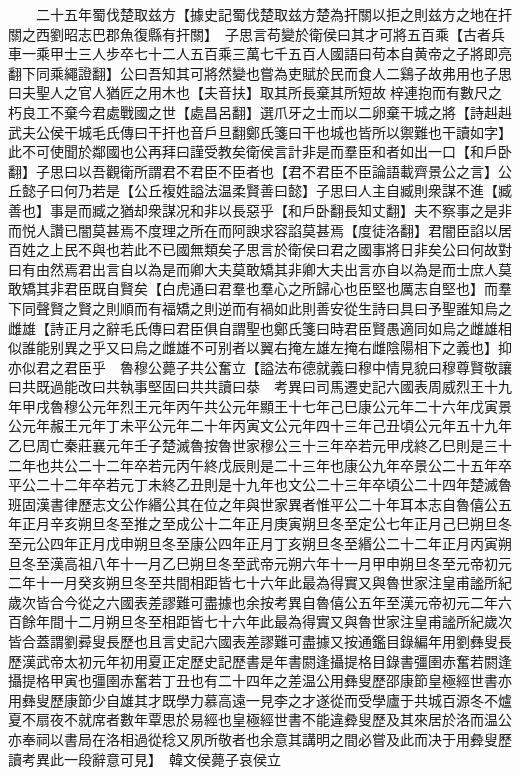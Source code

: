 　　二十五年蜀伐楚取兹方【據史記蜀伐楚取兹方楚為扞關以拒之則兹方之地在扞關之西劉昭志巴郡魚復縣有扞關】　子思言苟變於衛侯曰其才可將五百乘【古者兵車一乘甲士三人步卒七十二人五百乘三萬七千五百人國語曰苟本自黄帝之子將即亮翻下同乘繩證翻】公曰吾知其可將然變也嘗為吏賦於民而食人二鷄子故弗用也子思曰夫聖人之官人猶匠之用木也【夫音扶】取其所長棄其所短故梓連抱而有數尺之朽良工不棄今君處戰國之世【處昌呂翻】選爪牙之士而以二卵棄干城之將【詩赳赳武夫公侯干城毛氏傳曰干扞也音戶旦翻鄭氏箋曰干也城也皆所以禦難也干讀如字】此不可使聞於鄰國也公再拜曰謹受教矣衛侯言計非是而羣臣和者如出一口【和戶卧翻】子思曰以吾觀衛所謂君不君臣不臣者也【君不君臣不臣論語載齊景公之言】公丘懿子曰何乃若是【公丘複姓謚法温柔賢善曰懿】子思曰人主自臧則衆謀不進【臧善也】事是而臧之猶却衆謀况和非以長惡乎【和戶卧翻長知丈翻】夫不察事之是非而悦人讚已闇莫甚焉不度理之所在而阿諛求容諂莫甚焉【度徒洛翻】君闇臣諂以居百姓之上民不與也若此不已國無類矣子思言於衛侯曰君之國事將日非矣公曰何故對曰有由然焉君出言自以為是而卿大夫莫敢矯其非卿大夫出言亦自以為是而士庶人莫敢矯其非君臣既自賢矣【白虎通曰君羣也羣心之所歸心也臣堅也厲志自堅也】而羣下同聲賢之賢之則順而有福矯之則逆而有禍如此則善安從生詩曰具曰予聖誰知烏之雌雄【詩正月之辭毛氏傳曰君臣俱自謂聖也鄭氏箋曰時君臣賢愚適同如烏之雌雄相似誰能别異之乎又曰烏之雌雄不可别者以翼右掩左雄左掩右雌陰陽相下之義也】抑亦似君之君臣乎　魯穆公薨子共公奮立【謚法布德就義曰穆中情見貌曰穆尊賢敬讓曰共既過能改曰共執事堅固曰共共讀曰㳟　考異曰司馬遷史記六國表周威烈王十九年甲戌魯穆公元年烈王元年丙午共公元年顯王十七年己巳康公元年二十六年戊寅景公元年赧王元年丁未平公元年二十年丙寅文公元年四十三年己丑頃公元年五十九年乙巳周亡秦莊襄元年壬子楚滅魯按魯世家穆公三十三年卒若元甲戌終乙巳則是三十二年也共公二十二年卒若元丙午終戊辰則是二十三年也康公九年卒景公二十五年卒平公二十二年卒若元丁未終乙丑則是十九年也文公二十三年卒頃公二十四年楚滅魯班固漢書律歷志文公作緡公其在位之年與世家異者惟平公二十年耳本志自魯僖公五年正月辛亥朔旦冬至推之至成公十二年正月庚寅朔旦冬至定公七年正月己巳朔旦冬至元公四年正月戊申朔旦冬至康公四年正月丁亥朔旦冬至緡公二十二年正月丙寅朔旦冬至漢高祖八年十一月乙巳朔旦冬至武帝元朔六年十一月甲申朔旦冬至元帝初元二年十一月癸亥朔旦冬至共間相距皆七十六年此最為得實又與魯世家注皇甫謐所紀歲次皆合今從之六國表差謬難可盡據也余按考異自魯僖公五年至漢元帝初元二年六百餘年間十二月朔旦冬至相距皆七十六年此最為得實又與魯世家注皇甫謐所紀歲次皆合蓋謂劉彛叟長歷也且言史記六國表差謬難可盡據又按通鑑目錄編年用劉彝叟長歷漢武帝太初元年初用夏正定歷史記歷書是年書閼逢攝提格目錄書彊圉赤奮若閼逢攝提格甲寅也彊圉赤奮若丁丑也有二十四年之差温公用彝叟歷邵康節皇極經世書亦用彝叟歷康節少自雄其才既學力慕高遠一見李之才遂從而受學廬于共城百源冬不爐夏不扇夜不就席者數年覃思於易經也皇極經世書不能違彜叟歷及其來居於洛而温公亦奉祠以書局在洛相過從稔又夙所敬者也余意其講明之間必嘗及此而决于用彜叟歷讀考異此一段辭意可見】　韓文侯薨子哀侯立

